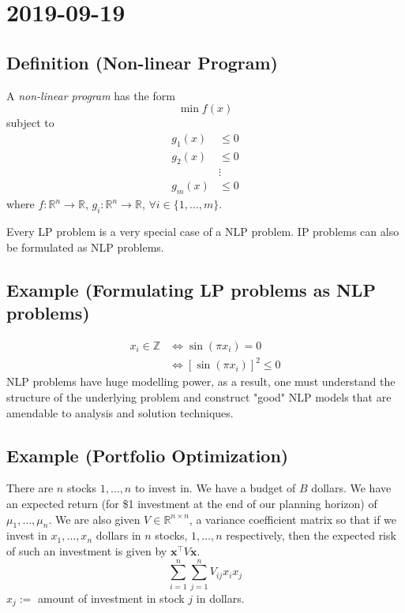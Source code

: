 \section{2019-09-19}
\begin{defbox}
    \subsection{Definition (Non-linear Program)}
    A \emph{non-linear program} has the form
    \[\min f(x)\]
subject to
\begin{align*}
    g_1(x)&\le 0\\
    g_2(x)&\le 0\\
    &\vdots\\
    g_m(x)&\le 0
\end{align*}
where
$f:\mathbb{R}^n\rightarrow \mathbb{R}$, 
$g_i:\mathbb{R}^n\rightarrow\mathbb{R}$, $\forall i\in\{1,\dots,m\}$.
\end{defbox}

Every LP problem is a very special case of a NLP problem. IP problems can
also be formulated as NLP problems.
\subsection{Example (Formulating LP problems as NLP problems)}
\begin{align*}
    x_i\in\mathbb{Z}&\iff \sin(\pi x_i)=0\\
    &\iff [\sin(\pi x_i)]^2\le 0
\end{align*}
NLP problems have huge modelling power, as a result, one must understand the
structure of the underlying problem and construct "good" NLP models that are
amendable to analysis and solution techniques.

\subsection{Example (Portfolio Optimization)}
There are $n$ stocks $1,\dots,n$ to invest in. We have a budget of $B$ dollars.
We have an expected return (for \$1 investment at the end of our planning
horizon) of $\mu_1,\dots,\mu_n$. We are also given 
$V\in \mathbb{R}^{n\times n}$, a variance coefficient matrix so that if
we invest in $x_1,\dots,x_n$ dollars in $n$ stocks, $1,\dots,n$ respectively,
then the expected risk of such an investment is given by 
$\bm{x}^\top  V\bm{x}$.
\[\sum\limits_{i = 1}^{n}\sum\limits_{j = 1}^{n}V_{ij}x_ix_j\]
$x_j:=$ amount of investment in stock $j$ in dollars.


